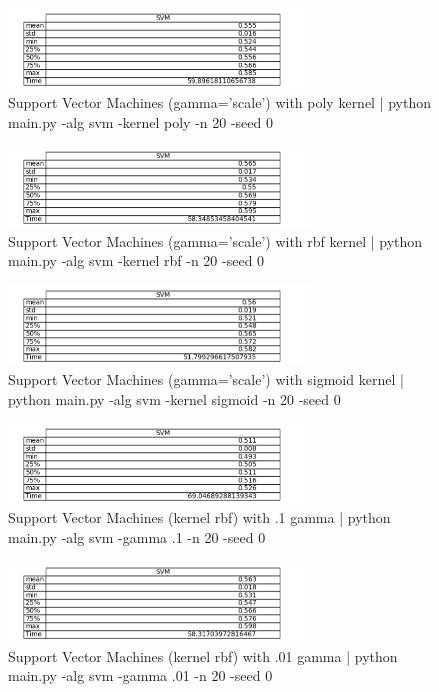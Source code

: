 \documentclass{article}
\begin{document}
\begin{figure}
\begin{center}
\includegraphics[width=8cm]{images/svm_poly}
\caption{Support Vector Machines (gamma='scale') with poly kernel | python main.py -alg svm -kernel poly -n 20 -seed 0}
\end{center}
\end{figure}
\begin{figure}
\begin{center}
\includegraphics[width=8cm]{images/svm_rbf}
\caption{Support Vector Machines (gamma='scale') with rbf kernel | python main.py -alg svm -kernel rbf -n 20 -seed 0}
\end{center}
\end{figure}
\begin{figure}
\begin{center}
\includegraphics[width=8cm]{images/svm_sigmoid}
\caption{Support Vector Machines (gamma='scale') with sigmoid kernel | python main.py -alg svm -kernel sigmoid -n 20 -seed 0}
\end{center}
\end{figure}
\begin{figure}
\begin{center}
\includegraphics[width=8cm]{images/svm_1}
\caption{Support Vector Machines (kernel rbf) with .1 gamma | python main.py -alg svm -gamma .1 -n 20 -seed 0}
\end{center}
\end{figure}
\begin{figure}
\begin{center}
\includegraphics[width=8cm]{images/svm_01}
\caption{Support Vector Machines (kernel rbf) with .01 gamma | python main.py -alg svm -gamma .01 -n 20 -seed 0}
\end{center}
\end{figure}
\end{document}

